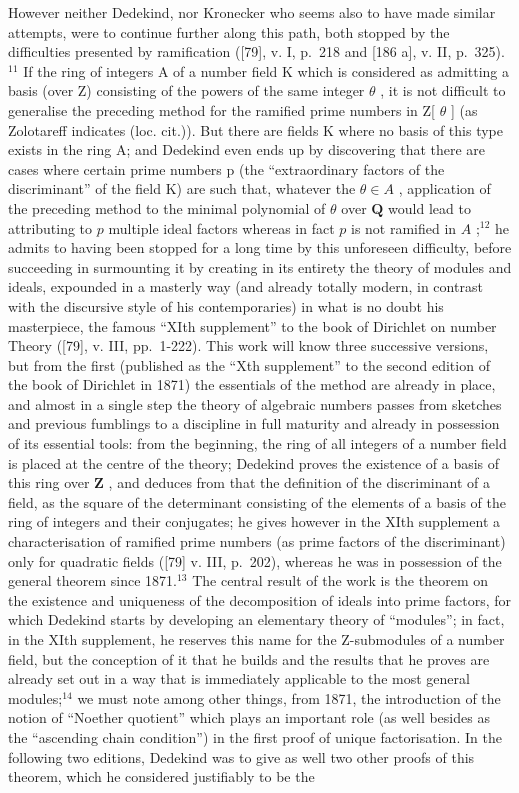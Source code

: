 However neither Dedekind, nor Kronecker who seems also to have made similar attempts, were to continue further along this path, both stopped by the difficulties presented by ramification ({[}79{]}, v. I, p.~218 and {[}186 a{]}, v. II, p.~325). \(^{11}\) If the ring of integers A of a number field K which is considered as admitting a basis (over Z) consisting of the powers of the same integer \(\theta\) , it is not difficult to generalise the preceding method for the ramified prime numbers in Z{[} \(\theta\) {]} (as Zolotareff indicates (loc. cit.)). But there are fields K where no basis of this type exists in the ring A; and Dedekind even ends up by discovering that there are cases where certain prime numbers p (the ``extraordinary factors of the discriminant'' of the field K) are such that, whatever the \(\theta \in A\) , application of the preceding method to the minimal polynomial of \(\theta\) over \(\mathbf{Q}\) would lead to attributing to \(p\) multiple ideal factors whereas in fact \(p\) is not ramified in \(A\) ;\(^{12}\) he admits to having been stopped for a long time by this unforeseen difficulty, before succeeding in surmounting it by creating in its entirety the theory of modules and ideals, expounded in a masterly way (and already totally modern, in contrast with the discursive style of his contemporaries) in what is no doubt his masterpiece, the famous ``XIth supplement'' to the book of Dirichlet on number Theory ({[}79{]}, v. III, pp.~1-222). This work will know three successive versions, but from the first (published as the ``Xth supplement'' to the second edition of the book of Dirichlet in 1871) the essentials of the method are already in place, and almost in a single step the theory of algebraic numbers passes from sketches and previous fumblings to a discipline in full maturity and already in possession of its essential tools: from the beginning, the ring of all integers of a number field is placed at the centre of the theory; Dedekind proves the existence of a basis of this ring over \(\mathbf{Z}\) , and deduces from that the definition of the discriminant of a field, as the square of the determinant consisting of the elements of a basis of the ring of integers and their conjugates; he gives however in the XIth supplement a characterisation of ramified prime numbers (as prime factors of the discriminant) only for quadratic fields ({[}79{]} v. III, p.~202), whereas he was in possession of the general theorem since 1871.\(^{13}\) The central result of the work is the theorem on the existence and uniqueness of the decomposition of ideals into prime factors, for which Dedekind starts by developing an elementary theory of ``modules''; in fact, in the XIth supplement, he reserves this name for the Z-submodules of a number field, but the conception of it that he builds and the results that he proves are already set out in a way that is immediately applicable to the most general modules;\(^{14}\) we must note among other things, from 1871, the introduction of the notion of ``Noether quotient'' which plays an important role (as well besides as the ``ascending chain condition'') in the first proof of unique factorisation. In the following two editions, Dedekind was to give as well two other proofs of this theorem, which he considered justifiably to be the 
